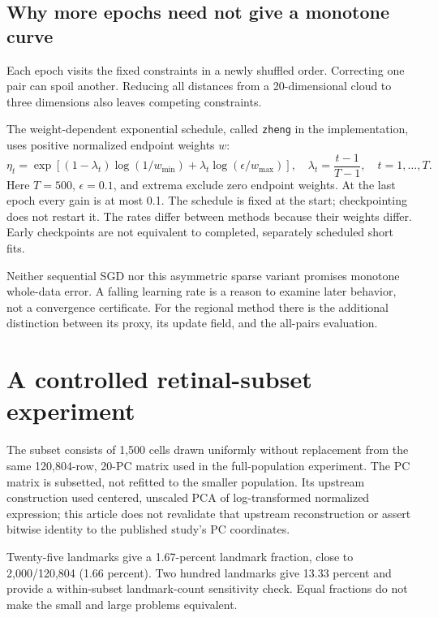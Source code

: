 \documentclass[11pt]{article}
\begin{document}
\subsection{Why more epochs need not give a monotone curve}
Each epoch visits the fixed constraints in a newly shuffled order. Correcting
one pair can spoil another. Reducing all distances from a 20-dimensional
cloud to three dimensions also leaves competing constraints.

The weight-dependent exponential schedule, called \texttt{zheng} in the
implementation, uses positive normalized endpoint weights $w$:
\begin{equation}\label{eq:schedule}
\eta_t=\exp\left[
(1-\lambda_t)\log(1/w_{\min})
{}+\lambda_t\log(\epsilon/w_{\max})\right],
\quad \lambda_t=\frac{t-1}{T-1},\quad t=1,\ldots,T.
\end{equation}
Here $T=500$, $\epsilon=0.1$, and extrema exclude zero endpoint weights.
At the last epoch every gain is at most 0.1. The schedule is fixed at the
start; checkpointing does not restart it. The rates differ between methods
because their weights differ. Early checkpoints are not equivalent to
completed, separately scheduled short fits.

Neither sequential SGD nor this asymmetric sparse variant promises monotone
whole-data error. A falling learning rate is a reason to examine later
behavior, not a convergence certificate. For the regional method there is
the additional distinction between its proxy, its update field, and the
all-pairs evaluation.

\section{A controlled retinal-subset experiment}
The subset consists of 1,500 cells drawn uniformly without replacement from
the same 120,804-row, 20-PC matrix used in the full-population experiment. The PC
matrix is subsetted, not refitted to the smaller population. Its upstream
construction used centered, unscaled PCA of log-transformed normalized
expression; this article does not revalidate that upstream reconstruction
or assert bitwise identity to the published study's PC coordinates.

Twenty-five landmarks give a 1.67-percent landmark fraction, close to
2,000/120,804 (1.66 percent). Two hundred landmarks give 13.33 percent and
provide a within-subset landmark-count sensitivity check. Equal fractions
do not make the small and large problems equivalent.
\end{document}
